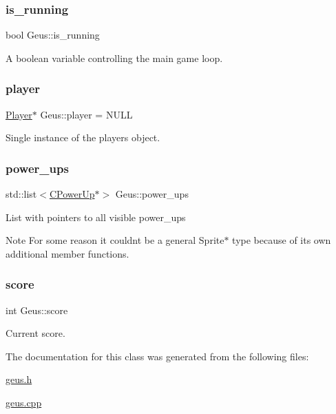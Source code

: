 \subsubsection{\texorpdfstring{is\+\_\+running}{is\_running}}
{\footnotesize\ttfamily bool Geus\+::is\+\_\+running\hspace{0.3cm}{\ttfamily [private]}}



A boolean variable controlling the main game loop. 

\mbox{\label{classGeus_a19106a3619fcb55de45bc8adac57496a}} 
\subsubsection{\texorpdfstring{player}{player}}
{\footnotesize\ttfamily \hyperlink{classPlayer}{Player}$\ast$ Geus\+::player = N\+U\+LL\hspace{0.3cm}{\ttfamily [private]}}



Single instance of the player\textquotesingle{}s object. 

\mbox{\label{classGeus_a797d5c7822b9b1e1eb6c46fca93551a3}} 
\subsubsection{\texorpdfstring{power\+\_\+ups}{power\_ups}}
{\footnotesize\ttfamily std\+::list$<$\hyperlink{classCPowerUp}{C\+Power\+Up}$\ast$$>$ Geus\+::power\+\_\+ups\hspace{0.3cm}{\ttfamily [private]}}

List with pointers to all visible power\+\_\+ups \begin{DoxyNote}{Note}
For some reason it couldn\textquotesingle{}t be a general Sprite$\ast$ type because of it\textquotesingle{}s own additional member functions. 
\end{DoxyNote}
\mbox{\label{classGeus_a2ad271a665a5442697299b756cfee290}} 
\subsubsection{\texorpdfstring{score}{score}}
{\footnotesize\ttfamily int Geus\+::score\hspace{0.3cm}{\ttfamily [private]}}



Current score. 



The documentation for this class was generated from the following files\+:\begin{DoxyCompactItemize}
\item 
\hyperlink{geus_8h}{geus.\+h}\item 
\hyperlink{geus_8cpp}{geus.\+cpp}\end{DoxyCompactItemize}
